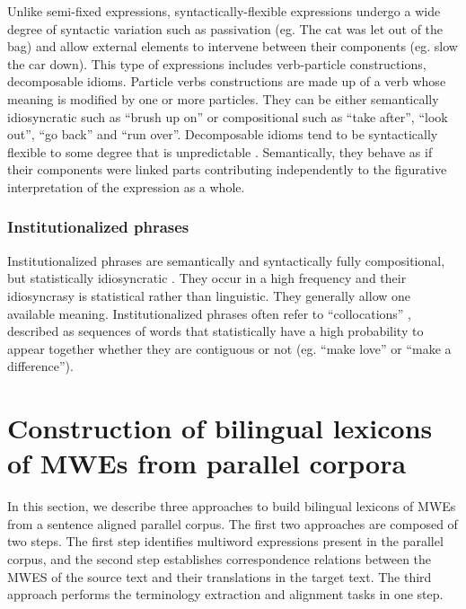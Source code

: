 \documentclass[output=paper,modfonts,nonflat]{langsci/langscibook}
\begin{document}
Unlike semi-fixed expressions, syntactically-flexible expressions undergo a wide degree of syntactic variation such as passivation (eg. The cat was let out of the bag) and allow external elements to intervene between their components (eg. slow the car down). This type of expressions includes verb-particle constructions, decomposable idioms. 
Particle verbs constructions are made up of a verb whose meaning is modified by one or more particles. They can be either semantically idiosyncratic such as ``brush up on''  or compositional such as ``take after'', ``look out'', ``go back'' and ``run over''.
Decomposable idioms tend to be syntactically flexible to some degree that is unpredictable \citep{riehemann01}. Semantically, they behave as if their components were linked parts contributing independently to the figurative interpretation of the expression as a whole.

\subsubsection{Institutionalized phrases}
Institutionalized phrases are semantically and syntactically fully compositional, but statistically idiosyncratic \citep{sag02}. They occur in a high frequency and their idiosyncrasy is statistical rather than linguistic. They generally allow one available meaning. Institutionalized phrases often refer to “collocations” \citep{barz1996komposition,riehemann01,burger2010phraseologie}, described as sequences of words that statistically have a high probability to appear together whether they are contiguous or not (eg. ``make love'' or ``make a difference'').

\section{Construction of bilingual lexicons of MWEs from parallel corpora}


In this section, we describe three approaches to build bilingual lexicons of MWEs from a
sentence aligned parallel corpus. The first two approaches are composed of two steps. The first step identifies multiword expressions present in the parallel corpus, and the second step establishes correspondence relations between the MWES of the source text and their translations in the target text. The third approach performs the terminology extraction and alignment tasks in one step. 

\end{document}
